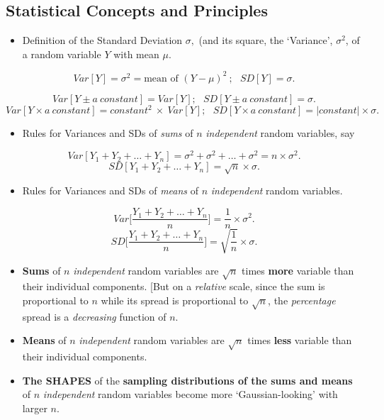 \documentclass[]{book}
\providecommand{\tightlist}{%
  \setlength{\itemsep}{0pt}\setlength{\parskip}{0pt}}
\begin{document}
\hypertarget{statistical-concepts-and-principles-1}{%
\subsection{Statistical Concepts and Principles}\label{statistical-concepts-and-principles-1}}

\begin{itemize}
\tightlist
\item
  Definition of the Standard Deviation \(\sigma,\) (and its square, the `Variance', \(\sigma^2\), of a random variable \(Y\) with mean \(\mu\).
\end{itemize}

\[ Var[Y] = \sigma^2 = \textrm{mean of } (Y - \mu)^2 \ ; \ \ \  SD[Y] = \sigma.\]

\[ Var[Y \pm a \ constant] = Var[Y] ; \ \ \  SD[Y \pm a \ constant] = \sigma.\]
\[ Var[Y \times a \ constant] = constant^2 \ \times \ Var[Y] ; \ \ \  SD[Y \times a \ constant] = |constant| \times \sigma.\]

\begin{itemize}
\tightlist
\item
  Rules for Variances and SDs of \emph{sums} of \(n\) \emph{independent} random variables, say
\end{itemize}

\[ Var[ Y_1 + Y_2 + \dots + Y_n] = \sigma^2 + \sigma^2 + \dots + \sigma^2 = n \times \sigma^2.\]
\[ SD[ Y_1 + Y_2 + \dots + Y_n]  = \sqrt{n} \times \sigma.\]

\begin{itemize}
\tightlist
\item
  Rules for Variances and SDs of \emph{means} of \(n\) \emph{independent} random variables.
\end{itemize}

\[ Var\bigg[\frac{Y_1 + Y_2 + \dots + Y_n}{n}\bigg] =  \frac{1}{n} \times \sigma^2.\]
\[ SD\bigg[\frac{Y_1 + Y_2 + \dots + Y_n}{n}\bigg] =  \sqrt{\frac{1}{n}} \times \sigma.\]

\begin{itemize}
\item
  \textbf{Sums} of \(n\) \emph{independent} random variables are \(\sqrt{n}\) times \textbf{more} variable than their individual components. {[}But on a \emph{relative} scale, since the sum is proportional to \(n\) while its spread is proportional to \(\sqrt{n}\), the \emph{percentage} spread is a \emph{decreasing} function of \(n.\)
\item
  \textbf{Means} of \(n\) \emph{independent} random variables are \(\sqrt{n}\) times \textbf{less} variable than their individual components.
\item
  \textbf{The SHAPES} of the \textbf{sampling distributions of the sums and means} of \(n\) \emph{independent} random variables become more `Gaussian-looking' with larger \(n.\)
\end{itemize}
\end{document}
